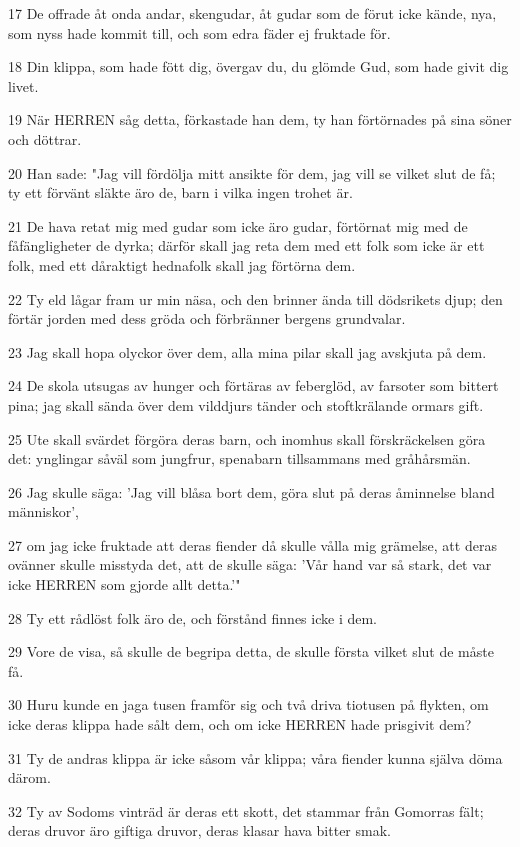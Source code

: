 \par 17 De offrade åt onda andar, skengudar, åt gudar som de förut icke kände, nya, som nyss hade kommit till, och som edra fäder ej fruktade för.
\par 18 Din klippa, som hade fött dig, övergav du, du glömde Gud, som hade givit dig livet.
\par 19 När HERREN såg detta, förkastade han dem, ty han förtörnades på sina söner och döttrar.
\par 20 Han sade: "Jag vill fördölja mitt ansikte för dem, jag vill se vilket slut de få; ty ett förvänt släkte äro de, barn i vilka ingen trohet är.
\par 21 De hava retat mig med gudar som icke äro gudar, förtörnat mig med de fåfängligheter de dyrka; därför skall jag reta dem med ett folk som icke är ett folk, med ett dåraktigt hednafolk skall jag förtörna dem.
\par 22 Ty eld lågar fram ur min näsa, och den brinner ända till dödsrikets djup; den förtär jorden med dess gröda och förbränner bergens grundvalar.
\par 23 Jag skall hopa olyckor över dem, alla mina pilar skall jag avskjuta på dem.
\par 24 De skola utsugas av hunger och förtäras av feberglöd, av farsoter som bittert pina; jag skall sända över dem vilddjurs tänder och stoftkrälande ormars gift.
\par 25 Ute skall svärdet förgöra deras barn, och inomhus skall förskräckelsen göra det: ynglingar såväl som jungfrur, spenabarn tillsammans med gråhårsmän.
\par 26 Jag skulle säga: 'Jag vill blåsa bort dem, göra slut på deras åminnelse bland människor',
\par 27 om jag icke fruktade att deras fiender då skulle vålla mig grämelse, att deras ovänner skulle misstyda det, att de skulle säga: 'Vår hand var så stark, det var icke HERREN som gjorde allt detta.'"
\par 28 Ty ett rådlöst folk äro de, och förstånd finnes icke i dem.
\par 29 Vore de visa, så skulle de begripa detta, de skulle första vilket slut de måste få.
\par 30 Huru kunde en jaga tusen framför sig och två driva tiotusen på flykten, om icke deras klippa hade sålt dem, och om icke HERREN hade prisgivit dem?
\par 31 Ty de andras klippa är icke såsom vår klippa; våra fiender kunna själva döma därom.
\par 32 Ty av Sodoms vinträd är deras ett skott, det stammar från Gomorras fält; deras druvor äro giftiga druvor, deras klasar hava bitter smak.
